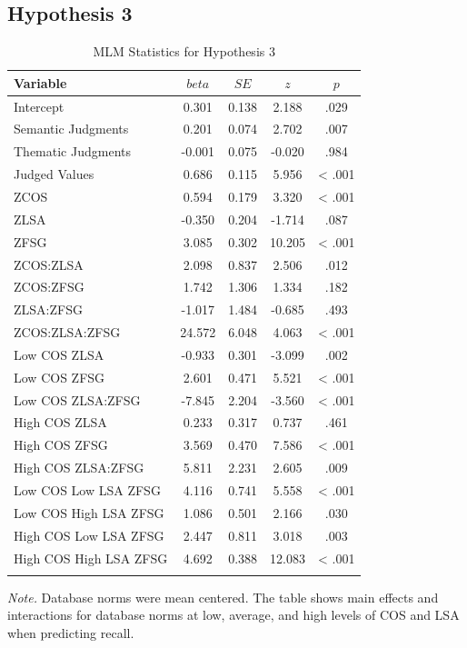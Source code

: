\documentclass[english,man]{apa6}
\theoremstyle{definition}
\theoremstyle{definition}
\theoremstyle{definition}
\theoremstyle{remark}
\begin{document}
\subsection{Hypothesis 3}\label{hypothesis-3}

\begin{table}[tbp]
\begin{center}
\begin{threeparttable}
\caption{\label{tab:hyp3-table}MLM Statistics for Hypothesis 3}
\small{
\begin{tabular}{lcccc}
\toprule
Variable & \multicolumn{1}{c}{$beta$} & \multicolumn{1}{c}{$SE$} & \multicolumn{1}{c}{$z$} & \multicolumn{1}{c}{$p$}\\
\midrule
Intercept & 0.301 & 0.138 & 2.188 & .029\\
Semantic Judgments & 0.201 & 0.074 & 2.702 & .007\\
Thematic Judgments & -0.001 & 0.075 & -0.020 & .984\\
Judged Values & 0.686 & 0.115 & 5.956 & < .001\\
ZCOS & 0.594 & 0.179 & 3.320 & < .001\\
ZLSA & -0.350 & 0.204 & -1.714 & .087\\
ZFSG & 3.085 & 0.302 & 10.205 & < .001\\
ZCOS:ZLSA & 2.098 & 0.837 & 2.506 & .012\\
ZCOS:ZFSG & 1.742 & 1.306 & 1.334 & .182\\
ZLSA:ZFSG & -1.017 & 1.484 & -0.685 & .493\\
ZCOS:ZLSA:ZFSG & 24.572 & 6.048 & 4.063 & < .001\\
Low COS ZLSA & -0.933 & 0.301 & -3.099 & .002\\
Low COS ZFSG & 2.601 & 0.471 & 5.521 & < .001\\
Low COS ZLSA:ZFSG & -7.845 & 2.204 & -3.560 & < .001\\
High COS ZLSA & 0.233 & 0.317 & 0.737 & .461\\
High COS ZFSG & 3.569 & 0.470 & 7.586 & < .001\\
High COS ZLSA:ZFSG & 5.811 & 2.231 & 2.605 & .009\\
Low COS Low LSA ZFSG & 4.116 & 0.741 & 5.558 & < .001\\
Low COS High LSA ZFSG & 1.086 & 0.501 & 2.166 & .030\\
High COS Low LSA ZFSG & 2.447 & 0.811 & 3.018 & .003\\
High COS High LSA ZFSG & 4.692 & 0.388 & 12.083 & < .001\\
\bottomrule
\addlinespace
\end{tabular}
}
\begin{tablenotes}[para]
\textit{Note.} Database norms were mean centered. The table shows main effects and interactions for database norms at low, average, and high levels of COS and LSA when predicting recall.
\end{tablenotes}
\end{threeparttable}
\end{center}
\end{table}
\end{document}
